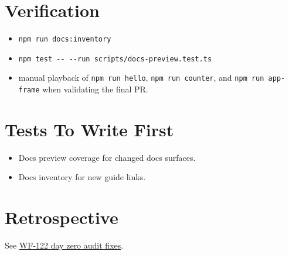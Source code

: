 \section{Verification}\label{record-148-verification}

\begin{itemize}
\tightlist
\item
  \texttt{n\allowbreak{}p\allowbreak{}m\allowbreak{} \allowbreak{}r\allowbreak{}u\allowbreak{}n\allowbreak{} \allowbreak{}d\allowbreak{}o\allowbreak{}c\allowbreak{}s\allowbreak{}:\allowbreak{}i\allowbreak{}n\allowbreak{}v\allowbreak{}e\allowbreak{}n\allowbreak{}t\allowbreak{}o\allowbreak{}r\allowbreak{}y}
\item
  \texttt{n\allowbreak{}p\allowbreak{}m\allowbreak{} \allowbreak{}t\allowbreak{}e\allowbreak{}s\allowbreak{}t\allowbreak{} \allowbreak{}-\allowbreak{}-\allowbreak{} \allowbreak{}-\allowbreak{}-\allowbreak{}r\allowbreak{}u\allowbreak{}n\allowbreak{} \allowbreak{}s\allowbreak{}c\allowbreak{}r\allowbreak{}i\allowbreak{}p\allowbreak{}t\allowbreak{}s\allowbreak{}/\allowbreak{}d\allowbreak{}o\allowbreak{}c\allowbreak{}s\allowbreak{}-\allowbreak{}p\allowbreak{}r\allowbreak{}e\allowbreak{}v\allowbreak{}i\allowbreak{}e\allowbreak{}w\allowbreak{}.\allowbreak{}t\allowbreak{}e\allowbreak{}s\allowbreak{}t\allowbreak{}.\allowbreak{}t\allowbreak{}s}
\item
  manual playback of \texttt{n\allowbreak{}p\allowbreak{}m\allowbreak{} \allowbreak{}r\allowbreak{}u\allowbreak{}n\allowbreak{} \allowbreak{}h\allowbreak{}e\allowbreak{}l\allowbreak{}l\allowbreak{}o}, \texttt{n\allowbreak{}p\allowbreak{}m\allowbreak{} \allowbreak{}r\allowbreak{}u\allowbreak{}n\allowbreak{} \allowbreak{}c\allowbreak{}o\allowbreak{}u\allowbreak{}n\allowbreak{}t\allowbreak{}e\allowbreak{}r}, and \texttt{n\allowbreak{}p\allowbreak{}m\allowbreak{} \allowbreak{}r\allowbreak{}u\allowbreak{}n\allowbreak{} \allowbreak{}a\allowbreak{}p\allowbreak{}p\allowbreak{}-\allowbreak{}f\allowbreak{}r\allowbreak{}a\allowbreak{}m\allowbreak{}e} when validating the final PR.
\end{itemize}

\section{Tests To Write First}\label{record-148-tests-to-write-first}

\begin{itemize}
\tightlist
\item
  Docs preview coverage for changed docs surfaces.
\item
  Docs inventory for new guide links.
\end{itemize}

\section{Retrospective}\label{record-148-retrospective}

See \href{https://github.com/flyingrobots/bijou/blob/cbd70612140e7a450d764b3c7be1c6af878b99bc/docs/method/retro/WF-122-day-zero-audit-fixes.md}{WF-122 day zero audit fixes}.

